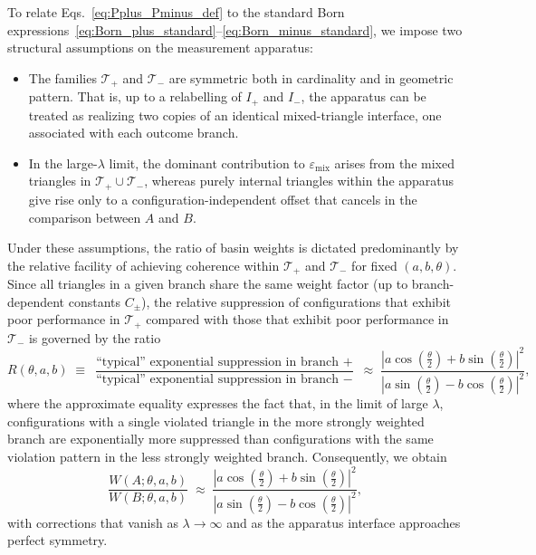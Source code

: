 \documentclass[11pt,a4paper]{article}
\numberwithin{equation}{section}
\begin{document}
To relate Eqs.~\eqref{eq:Pplus_Pminus_def} to the standard Born expressions~\eqref{eq:Born_plus_standard}--\eqref{eq:Born_minus_standard}, we impose two structural assumptions on the measurement apparatus:
\begin{itemize}
  \item[(i)] The families $\mathcal{T}_+$ and $\mathcal{T}_-$ are symmetric both in cardinality and in geometric pattern. That is, up to a relabelling of $I_+$ and $I_-$, the apparatus can be treated as realizing two copies of an identical mixed-triangle interface, one associated with each outcome branch.
  \item[(ii)] In the large-$\lambda$ limit, the dominant contribution to $\varepsilon_{\mathrm{mix}}$ arises from the mixed triangles in $\mathcal{T}_+\cup\mathcal{T}_-$, whereas purely internal triangles within the apparatus give rise only to a configuration-independent offset that cancels in the comparison between $A$ and $B$.
\end{itemize}
Under these assumptions, the ratio of basin weights is dictated predominantly by the relative facility of achieving coherence within $\mathcal{T}_+$ and $\mathcal{T}_-$ for fixed $(a,b,\theta)$. Since all triangles in a given branch share the same weight factor (up to branch-dependent constants $C_\pm$), the relative suppression of configurations that exhibit poor performance in $\mathcal{T}_+$ compared with those that exhibit poor performance in $\mathcal{T}_-$ is governed by the ratio
\begin{equation}
  R(\theta,a,b)
  \;\equiv\;
  \frac{\text{``typical'' exponential suppression in branch }+}
       {\text{``typical'' exponential suppression in branch }-}
  \;\approx\;
  \frac{\left|a\cos\left(\tfrac{\theta}{2}\right) + b\sin\left(\tfrac{\theta}{2}\right)\right|^2}
       {\left|a\sin\left(\tfrac{\theta}{2}\right) - b\cos\left(\tfrac{\theta}{2}\right)\right|^2},
\end{equation}
where the approximate equality expresses the fact that, in the limit of large $\lambda$, configurations with a single violated triangle in the more strongly weighted branch are exponentially more suppressed than configurations with the same violation pattern in the less strongly weighted branch. Consequently, we obtain
\begin{equation}
  \frac{W(A;\theta,a,b)}{W(B;\theta,a,b)}
  \;\approx\;
  \frac{\left|a\cos\left(\tfrac{\theta}{2}\right) + b\sin\left(\tfrac{\theta}{2}\right)\right|^2}
       {\left|a\sin\left(\tfrac{\theta}{2}\right) - b\cos\left(\tfrac{\theta}{2}\right)\right|^2},
  \label{eq:WA_over_WB}
\end{equation}
with corrections that vanish as $\lambda\to\infty$ and as the apparatus interface approaches perfect symmetry.
\end{document}
